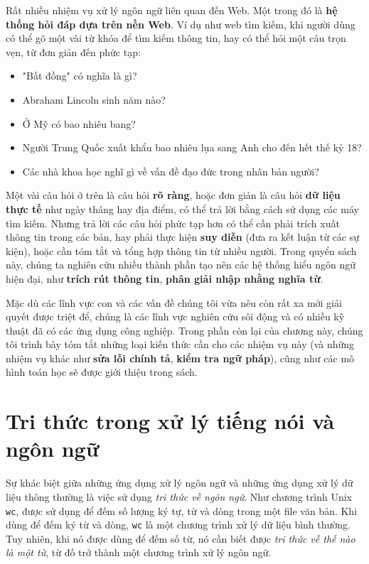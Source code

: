 Rất nhiều nhiệm vụ xử lý ngôn ngữ liên quan đến Web. Một trong đó là \textbf{hệ thống hỏi đáp dựa trên nền Web}. Ví dụ như web tìm kiếm, khi người dùng có thể gõ một vài từ khóa để tìm kiếm thông tin, hay có thể hỏi một câu trọn vẹn, từ đơn giản đến phức tạp:

\begin{itemize}
  \item "Bất đồng" có nghĩa là gì?
  \item Abraham Lincoln sinh năm nào?
  \item Ở Mỹ có bao nhiêu bang?
  \item Người Trung Quốc xuất khẩu bao nhiêu lụa sang Anh cho đến hết thế kỷ 18?
  \item Các nhà khoa học nghĩ gì về vấn đề đạo đức trong nhân bản người?
\end{itemize}

Một vài câu hỏi ở trên là câu hỏi \textbf{rõ ràng}, hoặc đơn giản là câu hỏi \textbf{dữ liệu thực tế} như ngày tháng hay địa điểm, có thể trả lời bằng cách sử dụng các máy tìm kiếm. Nhưng trả lời các câu hỏi phức tạp hơn có thể cần phải trích xuất thông tin trong các bản, hay phải thực hiện \textbf{suy diễn} (đưa ra kết luận từ các sự kiện), hoặc cần tóm tắt và tổng hợp thông tin từ nhiều người. Trong quyển sách này, chúng ta nghiên cứu nhiều thành phần tạo nên các hệ thống hiểu ngôn ngữ hiện đại, như \textbf{trích rút thông tin}, \textbf{phân giải nhập nhằng nghĩa từ}.

Mặc dù các lĩnh vực con và các vấn đề chúng tôi vừa nêu còn rất xa mới giải quyết được triệt để, chúng là các lĩnh vực nghiên cứu sôi động và có nhiều kỹ thuật đã có các ứng dụng công nghiệp. Trong phần còn lại của chương này, chúng tôi trình bày tóm tắt những loại kiến thức cần cho các nhiệm vụ này (và những nhiệm vụ khác như \textbf{sửa lỗi chính tả}, \textbf{kiểm tra ngữ pháp}), cũng như các mô hình toán học sẽ được giới thiệu trong sách.

\section{Tri thức trong xử lý tiếng nói và ngôn ngữ}

Sự khác biệt giữa những ứng dụng xử lý ngôn ngữ và những ứng dụng xử lý dữ liệu thông thường là việc sử dụng \textit{tri thức về ngôn ngữ}. Như chương trình Unix \verb|wc|, được sử dụng để đếm số lượng ký tự, từ và dòng trong một file văn bản. Khi dùng để đếm ký từ và dòng, \verb|wc| là một chương trình xử lý dữ liệu bình thường. Tuy nhiên, khi nó được dùng để đếm số từ, nó cần biết được \textit{tri thức về thế nào là một từ}, từ đố trở thành một chương trình xử lý ngôn ngữ.

